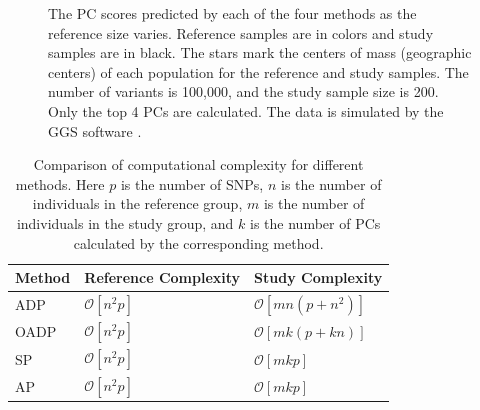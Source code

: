 \documentclass{article}
\newcommand{\bO}{\mathcal{O}}
\begin{document}
\begin{figure}
\begin{subfigure}{.5\textwidth}
\end{subfigure}
\caption{
  The PC scores predicted by each of the four methods
  as the reference size varies.
  Reference samples are in colors
  and study samples are in black.
  The stars mark the centers of mass (geographic centers) of each population for the reference and study samples.
  The number of variants is 100,000,
  and the study sample size is 200.
  Only the top 4 PCs are calculated.
  The data is simulated by the GGS software \citep{mathieson2012differential}.
}
\end{figure}

\begin{table}[h]
  \centering
  \begin{tabular}{|l|l|l|}
    \hline
    Method & Reference Complexity & Study Complexity \\ 
    \hline
    ADP & $\bO[n^2 p]$ & $\bO[mn(p + n^2)]$ \\
    \hline
    OADP & $\bO[n^2 p]$ & $\bO[mk(p + k n)]$ \\
    \hline
    SP & $\bO[n^2p]$ & $\bO[mkp]$ \\
    \hline
    AP & $\bO[n^2p]$ &  $\bO[mkp]$ \\
    \hline
  \end{tabular}
  \caption{
    Comparison of computational complexity for different methods.
    Here $p$ is the number of SNPs,
    $n$ is the number of individuals in the reference group,
    $m$ is the number of individuals in the  study group,
    and $k$ is the number of PCs calculated by the corresponding method.
  }
  \label{tbl:cplx}
\end{table}
\end{document}
